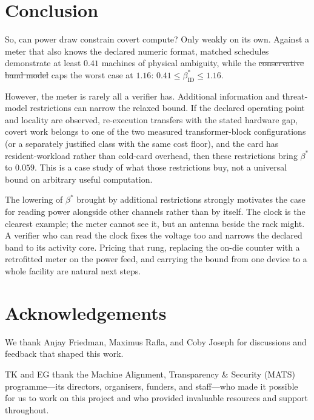 \documentclass{article}
\makeatletter
\theoremstyle{plain}
\theoremstyle{definition}
\theoremstyle{remark}
\providecommand{\DIFaddtex}[1]{{\protect\color{blue}\uwave{#1}}} %
\providecommand{\DIFdeltex}[1]{{\protect\color{red}\sout{#1}}} %
\providecommand{\DIFaddbegin}{} %
\providecommand{\DIFaddend}{} %
\providecommand{\DIFdelbegin}{} %
\providecommand{\DIFdelend}{} %
\providecommand{\DIFadd}[1]{\texorpdfstring{\DIFaddtex{#1}}{#1}} %
\providecommand{\DIFdel}[1]{\texorpdfstring{\DIFdeltex{#1}}{}} %
\providecommand{\DIFscaledelfig}{0.5}
\newlength{\DIFdelgraphicswidth} %
\newlength{\DIFdelgraphicsheight} %
\providecommand{\DIFaddincludegraphics}[2][]{{\color{blue}\fbox{\DIFOincludegraphics[#1]{#2}}}} %
\providecommand{\DIFdelincludegraphics}[2][]{%
\sbox{\DIFdelgraphicsbox}{\DIFOincludegraphics[#1]{#2}}%
\settoboxwidth{\DIFdelgraphicswidth}{\DIFdelgraphicsbox} %
\settoboxtotalheight{\DIFdelgraphicsheight}{\DIFdelgraphicsbox} %
\scalebox{\DIFscaledelfig}{%
\parbox[b]{\DIFdelgraphicswidth}{\usebox{\DIFdelgraphicsbox}\\[-\baselineskip] \rule{\DIFdelgraphicswidth}{0em}}\llap{\resizebox{\DIFdelgraphicswidth}{\DIFdelgraphicsheight}{%
\setlength{\unitlength}{\DIFdelgraphicswidth}%
\begin{picture}(1,1)%
\thicklines\linethickness{2pt} %
{\color[rgb]{1,0,0}\put(0,0){\framebox(1,1){}}}%
{\color[rgb]{1,0,0}\put(0,0){\line( 1,1){1}}}%
{\color[rgb]{1,0,0}\put(0,1){\line(1,-1){1}}}%
\end{picture}%
}\hspace*{3pt}}} %
} %
\DeclareRobustCommand{\DIFaddbegin}{\DIFOaddbegin \let\includegraphics\DIFaddincludegraphics} %
\DeclareRobustCommand{\DIFaddend}{\DIFOaddend \let\includegraphics\DIFOincludegraphics} %
\DeclareRobustCommand{\DIFdelbegin}{\DIFOdelbegin \let\includegraphics\DIFdelincludegraphics} %
\DeclareRobustCommand{\DIFdelend}{\DIFOaddend \let\includegraphics\DIFOincludegraphics} %
\let\sout@orig\sout %
\renewcommand{\sout}[1]{\ifmmode\text{\sout@orig{\ensuremath{#1}}}\else\sout@orig{#1}\fi} %
\makeatother
\begin{document}
\section{Conclusion}
\label{sec:conclusion}

So, can power draw constrain covert compute? Only weakly on its
own. Against a meter that also knows the declared numeric format, matched
schedules demonstrate at least $0.41$ machines of physical ambiguity, while
the \DIFdelbegin \DIFdel{conservative band model }\DIFdelend \DIFaddbegin \DIFadd{relaxed bound }\DIFaddend caps the worst case at $1.16$:
$0.41 \leq \beta_{\mathrm{ID}}^{*} \leq 1.16$.

However, the meter is rarely all a verifier has. Additional information and threat-model restrictions can narrow the relaxed
bound. If the declared operating point and locality are observed, re-execution transfers
with the stated hardware gap, covert work belongs to one of the two measured
transformer-block configurations (or a separately justified class with the
same cost floor), and the card has resident-workload rather than cold-card
overhead, then these restrictions bring $\beta^{*}$ to $0.059$. This is a case study of what those restrictions buy, not a universal
bound on arbitrary useful computation.

The lowering of $\beta^{*}$ brought by additional restrictions strongly motivates the case for reading power alongside other channels rather than by itself. The clock is the clearest example; the meter cannot see it, but an
antenna beside the rack might. A verifier who can read the clock fixes the voltage
too and narrows the declared band to its activity core. Pricing that rung,
replacing the on-die counter with a retrofitted meter on the power feed, and
carrying the bound from one device to a whole facility are natural next steps.

\DIFaddbegin \ifdefined\anonymous\else
\DIFaddend \section*{Acknowledgements}

We thank Anjay Friedman, Maximus Rafla, and Coby Joseph for
discussions and feedback that shaped this work.

TK and EG thank the Machine Alignment, Transparency \& Security (MATS) programme---its
directors, organisers, funders, and staff---who made it possible for us to
work on this project and who provided invaluable resources and support
throughout.
\DIFaddbegin \fi
\DIFaddend 
\end{document}
